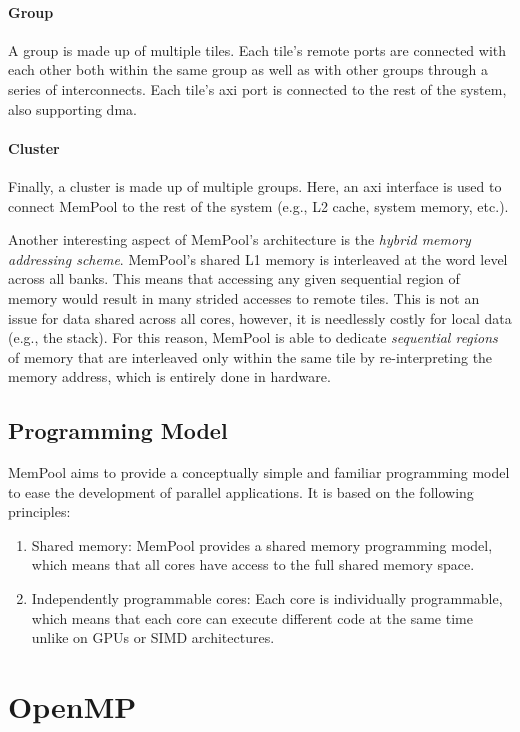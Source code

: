 \paragraph{Group} A group is made up of multiple tiles. Each tile's remote ports are connected with
each other both within the same group as well as with other groups through a series of
interconnects. Each tile's \gls{axi} port is connected to the rest of the system, also supporting
\gls{dma}.

\paragraph{Cluster} Finally, a cluster is made up of multiple groups. Here, an \gls{axi} interface
is used to connect MemPool to the rest of the system (e.g., L2 cache, system memory, etc.).

Another interesting aspect of MemPool's architecture is the \emph{hybrid memory addressing scheme}.
MemPool's shared L1 memory is interleaved at the word level across all banks. This means that
accessing any given sequential region of memory would result in many strided accesses to remote
tiles. This is not an issue for data shared across all cores, however, it is needlessly costly for
local data (e.g., the stack). For this reason, MemPool is able to dedicate \emph{sequential regions}
of memory that are interleaved only within the same tile by re-interpreting the memory address,
which is entirely done in hardware.

\subsection{Programming Model}

MemPool aims to provide a conceptually simple and familiar programming model to ease the development
of parallel applications. It is based on the following principles:

\begin{enumerate}
	\item Shared memory: MemPool provides a shared memory programming model, which means that all
	      cores have access to the full shared memory space.
	\item Independently programmable cores: Each core is individually programmable, which means that
	      each core can execute different code at the same time unlike on GPUs or SIMD architectures.
\end{enumerate}

\section{OpenMP}
\label{sec:openmp}

